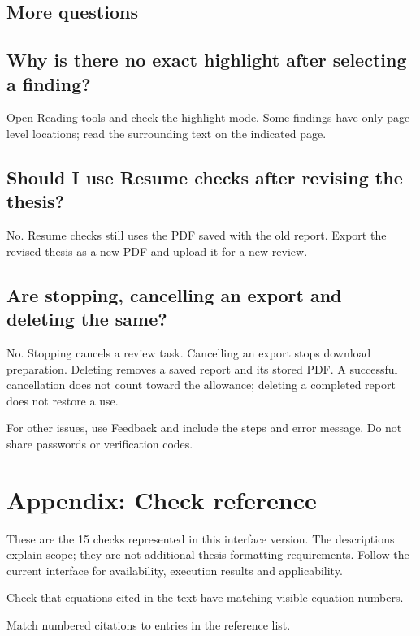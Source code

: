 \documentclass[12pt,a4paper]{article}
\newcommand{\note}[1]{\par\medskip\noindent\begingroup\setlength{\fboxsep}{9pt}\colorbox{pale}{\parbox{\dimexpr\linewidth-18pt\relax}{#1}}\endgroup\par}
\begin{document}
\clearpage\subsection*{More questions}
\Needspace{32mm}\subsection*{Why is there no exact highlight after selecting a finding?}Open Reading tools and check the highlight mode. Some findings have only page-level locations; read the surrounding text on the indicated page.\par
\Needspace{32mm}\subsection*{Should I use Resume checks after revising the thesis?}No. Resume checks still uses the PDF saved with the old report. Export the revised thesis as a new PDF and upload it for a new review.\par
\Needspace{32mm}\subsection*{Are stopping, cancelling an export and deleting the same?}No. Stopping cancels a review task. Cancelling an export stops download preparation. Deleting removes a saved report and its stored PDF. A successful cancellation does not count toward the allowance; deleting a completed report does not restore a use.\par
\note{For other issues, use Feedback and include the steps and error message. Do not share passwords or verification codes.}
\clearpage\section*{Appendix: Check reference}\label{en:rules}
These are the 15 checks represented in this interface version. The descriptions explain scope; they are not additional thesis-formatting requirements. Follow the current interface for availability, execution results and applicability.
\Needspace{26mm}\par{}\par Check that equations cited in the text have matching visible equation numbers.\par
\Needspace{26mm}\par{}\par Match numbered citations to entries in the reference list.\par
\end{document}
